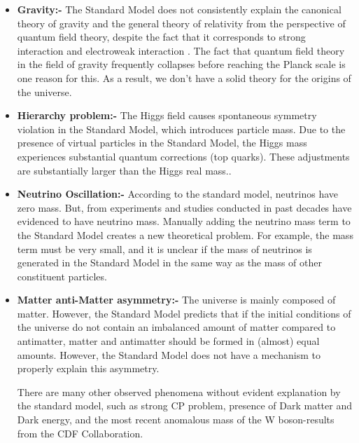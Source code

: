 \begin{itemize}
    \item \textbf{Gravity:-} The Standard Model does not consistently explain the canonical theory of gravity and the general theory of relativity from the perspective of quantum field theory, despite the fact that it corresponds to strong interaction and electroweak interaction \cite{Bilson_Thompson_2007}. The fact that quantum field theory in the field of gravity frequently collapses before reaching the Planck scale is one reason for this. As a result, we don't have a solid theory for the origins of the universe.
    
    \item \textbf{Hierarchy problem:-} The Higgs field causes spontaneous symmetry violation in the Standard Model, which introduces particle mass\cite{Higgs:1964pj}. Due to the presence of virtual particles in the Standard Model, the Higgs mass experiences substantial quantum corrections (top quarks). These adjustments are substantially larger than the Higgs real mass.\cite{Aad_2015}. 

\item \textbf{Neutrino Oscillation:-} According to the standard model, neutrinos have zero mass. But, from experiments and studies conducted in past decades have evidenced to have neutrino mass. Manually adding the neutrino mass term to the Standard Model creates a new theoretical problem\cite{neutino_1}. For example, the mass term must be very small, and it is unclear if the mass of neutrinos is generated in the Standard Model in the same way as the mass of other constituent particles\cite{Ellis_2020}.
    
    
 \item \textbf{Matter anti-Matter asymmetry:-} The universe is mainly composed of matter. However, the Standard Model predicts that if the initial conditions of the universe do not contain an imbalanced amount of matter compared to antimatter, matter and antimatter should be formed in (almost) equal amounts\cite{Dasgupta_2020}. However, the Standard Model does not have a mechanism to properly explain this asymmetry.

There are many other observed phenomena without evident explanation by the standard model, such as strong CP problem\cite{doi:10.1126/science.abk1781}, presence of Dark matter and Dark energy, and the most recent anomalous mass of the W boson-results from the CDF Collaboration\cite{CMS:2008xjf}.
\end{itemize}   




